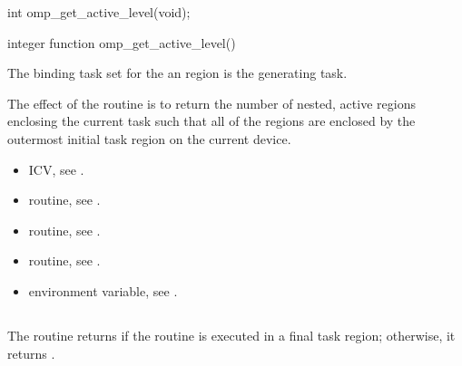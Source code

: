 \format
\begin{ccppspecific}
\begin{ompcFunction}
int omp_get_active_level(void);
\end{ompcFunction}
\end{ccppspecific}

\begin{fortranspecific}
\begin{ompfFunction}
integer function omp_get_active_level()
\end{ompfFunction}
\end{fortranspecific}

\binding
The binding task set for the an  region is the generating
task.

\effect
The effect of the  routine is to return the number of nested,
active  regions enclosing the current task such that all of the 
regions are enclosed by the outermost initial task region on the current device.

\crossreferences
\begin{itemize}
\item {} ICV, see
.

\item {} routine, see
.

\item {} routine, see
.

\item {} routine, see
.

\item {} environment variable, see
.
\end{itemize}











\subsection{}
\label{subsec:omp_in_final}
\summary
The  routine returns  if the routine is executed in a final task
region; otherwise, it returns .


